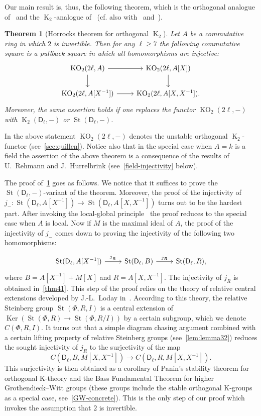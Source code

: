 \documentclass[oneside, 8pt]{amsart}
\newtheorem{theorem}{Theorem}
\theoremstyle{remark}
\theoremstyle{definition}
\numberwithin{lemma}{section}
\numberwithin{prop}{section}
\numberwithin{corollary}{section}
\numberwithin{externaltheorem}{section}
\DeclareMathOperator{\Ker}{Ker}
\DeclareMathOperator{\St}{St}
\DeclareMathOperator{\K}{K}
\DeclareMathOperator{\KO}{KO}
\newcommand{\inv}{^{-1}}
\newcommand{\rD}{\mathsf{D}}
\numberwithin{equation}{section}
\begin{document}
Our main result is, thus, the following theorem, which is the orthogonal analogue of~\cite[Theorem~5.1]{Tu83} and the $\K_2$-analogue of~\cite[Theorem~6.8]{Su82} (cf. also with~\cite[Theorem~VI.5.2]{Lam10} and~\cite[Theorem~1.1]{St-poly}).
\begin{theorem}[Horrocks theorem for orthogonal $\K_2$]\label{thm:main} Let $A$ be a commutative ring in which $2$ is invertible. Then for any $\ell \geq 7$ the following commutative square is a pullback square in which all homomorphisms are injective:
\[\begin{tikzcd} \KO_2(2\ell, A) \arrow{r} \arrow{d} & \KO_2(2\ell, A[X]) \arrow{d} \\ \KO_2(2\ell, A[X\inv]) \arrow{r} & \KO_2(2\ell, A[X, X\inv]). \end{tikzcd}\]
Moreover, the same assertion holds if one replaces the functor $\KO_2(2\ell, -)$ with $\K_2(\rD_\ell, -)$ or $\St(\rD_\ell, -)$. \end{theorem}
In the above statement $\KO_2(2\ell, -)$ denotes the unstable orthogonal $\K_2$-functor (see~\cref{sec:quillen}). Notice also that in the special case when $A=k$ is a field the assertion of the above theorem is a consequence of the results of U.~Rehmann and J.~Hurrelbrink (see~\cref{field-injectivity} below).

The proof of~\cref{thm:main} goes as follows. We notice that it suffices to prove the $\St(\rD_\ell, -)$-variant of the theorem. Moreover, the proof of the injectivity of
$j_- \colon \St(\rD_\ell, A[X\inv]) \to \St(\rD_\ell, A[X, X\inv])$ turns out to be the hardest part. After invoking the local-global principle~\cite[Theorem~2]{LS17} the proof reduces to the special case when $A$ is local.
Now if $M$ is the maximal ideal of $A$, the proof of the injectivity of $j_-$ comes down to proving the injectivity of the following two homomorphisms:
\[\begin{tikzcd} \St(\rD_\ell, A[X^{-1}]) \arrow{r}{j_B^-} & \St(\rD_\ell, B) \arrow{r}{j_R} & \St(\rD_\ell, R), \end{tikzcd} \]
where $B = A[X\inv] + M[X]$ and $R = A[X, X\inv]$.
The injectivity of $j_R$ is obtained in~\cref{thm41}. This step of the proof relies on the theory of relative central extensions developed by J.-L.~Loday in~\cite{Lo78}. According to this theory, the relative Steinberg group $\St(\Phi, R, I)$ is a central extension of $\Ker(\St(\Phi, R) \to \St(\Phi, R/I))$ by a certain subgroup, which we denote $C(\Phi, R, I)$. It turns out that a simple diagram chasing argument combined with a certain lifting property of relative Steinberg groups (see~\cref{lem:lemma32}) reduces the sought injectivity of $j_R$ to the surjectivity of the map \[C(\rD_\ell, B, M[X, X\inv]) \to C(\rD_\ell, R, M[X, X\inv]).\] This surjectivity is then obtained as a corollary of Panin's stability theorem for orthogonal K-theory and the Bass Fundamental Theorem for higher Grothendieck--Witt groups (these groups include the stable orthogonal K-groups as a special case, see~\eqref{GW-concrete}). This is the only step of our proof which invokes the assumption that $2$ is invertible. 
\end{document}
